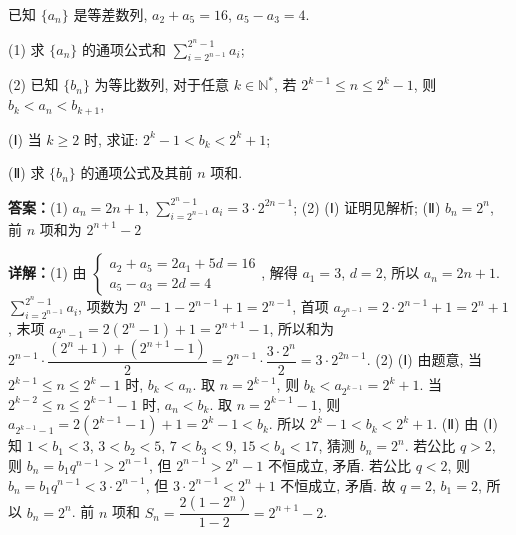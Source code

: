 \begin{question}[points=15]
已知 $\{a_n\}$ 是等差数列, $a_2 + a_5 = 16$, $a_5 - a_3 = 4$.

(1) 求 $\{a_n\}$ 的通项公式和 $\displaystyle\sum_{i=2^{n-1}}^{2^n-1} a_i$;

(2) 已知 $\{b_n\}$ 为等比数列, 对于任意 $k \in \mathbb{N}^*$, 若 $2^{k-1} \le n \le 2^k - 1$, 则 $b_k < a_n < b_{k+1}$,

   (Ⅰ) 当 $k \ge 2$ 时, 求证: $2^k - 1 < b_k < 2^k + 1$;

   (Ⅱ) 求 $\{b_n\}$ 的通项公式及其前 $n$ 项和.
\begin{solution}
\textbf{答案：}(1) $a_n = 2n + 1$, $\displaystyle\sum_{i=2^{n-1}}^{2^n-1} a_i = 3 \cdot 2^{2n-1}$; (2) (Ⅰ) 证明见解析; (Ⅱ) $b_n = 2^n$, 前 $n$ 项和为 $2^{n+1} - 2$

\textbf{详解：}(1) 由 $\begin{cases} a_2 + a_5 = 2a_1 + 5d = 16 \\ a_5 - a_3 = 2d = 4 \end{cases}$, 解得 $a_1 = 3$, $d = 2$, 所以 $a_n = 2n+1$. $\displaystyle\sum_{i=2^{n-1}}^{2^n-1} a_i$, 项数为 $2^n-1 - 2^{n-1} + 1 = 2^{n-1}$, 首项 $a_{2^{n-1}} = 2\cdot2^{n-1}+1 = 2^n+1$, 末项 $a_{2^n-1} = 2(2^n-1)+1 = 2^{n+1}-1$, 所以和为 $2^{n-1} \cdot \dfrac{(2^n+1)+(2^{n+1}-1)}{2} = 2^{n-1} \cdot \dfrac{3\cdot2^n}{2} = 3 \cdot 2^{2n-1}$.
(2) (Ⅰ) 由题意, 当 $2^{k-1} \le n \le 2^k-1$ 时, $b_k < a_n$. 取 $n = 2^{k-1}$, 则 $b_k < a_{2^{k-1}} = 2^k+1$. 当 $2^{k-2} \le n \le 2^{k-1}-1$ 时, $a_n < b_k$. 取 $n = 2^{k-1}-1$, 则 $a_{2^{k-1}-1} = 2(2^{k-1}-1)+1 = 2^k-1 < b_k$. 所以 $2^k-1 < b_k < 2^k+1$.
(Ⅱ) 由 (Ⅰ) 知 $1 < b_1 < 3$, $3 < b_2 < 5$, $7 < b_3 < 9$, $15 < b_4 < 17$, 猜测 $b_n = 2^n$. 若公比 $q > 2$, 则 $b_n = b_1 q^{n-1} > 2^{n-1}$, 但 $2^{n-1} > 2^n-1$ 不恒成立, 矛盾. 若公比 $q < 2$, 则 $b_n = b_1 q^{n-1} < 3 \cdot 2^{n-1}$, 但 $3\cdot2^{n-1} < 2^n+1$ 不恒成立, 矛盾. 故 $q=2$, $b_1 = 2$, 所以 $b_n = 2^n$. 前 $n$ 项和 $S_n = \dfrac{2(1-2^n)}{1-2} = 2^{n+1} - 2$.
\end{solution}
\end{question}

